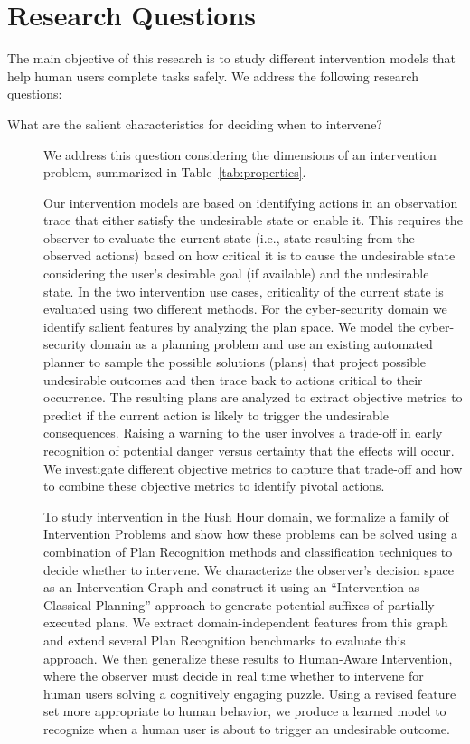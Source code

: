 \section{Research Questions}
The main objective of this research is to study different intervention models that help human users complete tasks safely. We address the following research questions: 
\begin{description}
\item[What are the salient characteristics for deciding when to intervene?]
We address this question considering the dimensions of an intervention problem, summarized in Table~\ref{tab:properties}.

Our intervention models are based on identifying actions in an observation trace that either satisfy the undesirable state or enable it. 
This requires the observer to evaluate the current state (i.e., state resulting from the observed actions) based on how critical it is to cause the undesirable state considering the user's desirable goal (if available) and the undesirable state.
In the two intervention use cases, criticality of the current state is evaluated using two different methods. 
For the cyber-security domain we identify salient features by analyzing the plan space. 
We model the cyber-security domain as a planning problem and use an existing automated planner to  sample the possible solutions (plans) that project possible undesirable outcomes and then trace back to actions critical to their occurrence. 
The resulting plans are analyzed to extract objective metrics to predict if the current action is likely to trigger the undesirable consequences. 
Raising a warning to the user involves a trade-off in early recognition of potential danger versus certainty that the effects will occur. 
We investigate different objective metrics to capture that trade-off and how to combine these objective metrics to identify pivotal actions. 

To study intervention in the Rush Hour domain, we formalize a family of Intervention Problems and show how these problems can be solved using a combination of Plan Recognition methods and classification techniques to decide whether to intervene. 
We characterize the observer's decision space as an Intervention Graph and construct it using an ``Intervention as Classical Planning'' approach to generate potential suffixes of partially executed plans. 
We extract domain-independent features from this graph and extend several Plan Recognition benchmarks to evaluate this approach. 
We then generalize these results to Human-Aware Intervention, where the observer must decide in
real time whether to intervene for human users solving a cognitively engaging puzzle. 
Using a revised feature set more appropriate to human behavior, we produce a learned model to recognize when a human user is about to trigger an undesirable outcome.


\end{description}
